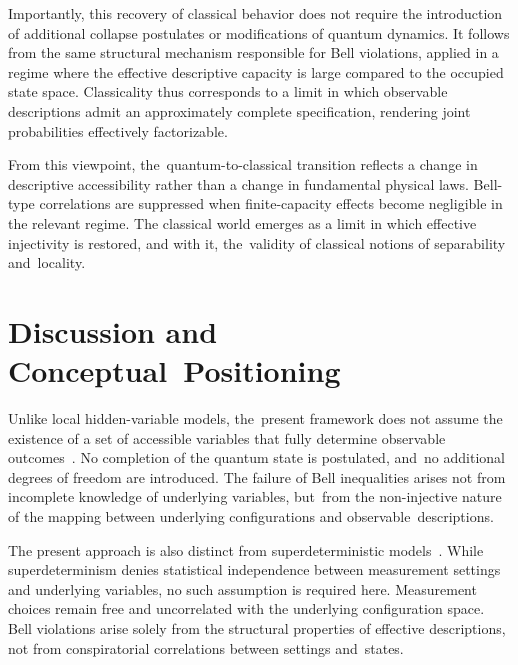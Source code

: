 \documentclass[11pt,a4paper]{article}
\theoremstyle{remark}
\begin{document}
  Importantly, this recovery of classical behavior does not require the introduction
  of additional collapse postulates or modifications of quantum dynamics.
  It follows from the same structural mechanism responsible for Bell violations,
  applied in a regime where the effective descriptive capacity is large compared to
  the occupied state space.
  Classicality thus corresponds to a limit in which observable descriptions admit an
  approximately complete specification, rendering joint probabilities effectively
  factorizable.

  From this viewpoint, the~quantum-to-classical transition reflects a change in
  descriptive accessibility rather than a change in fundamental physical laws.
  Bell-type correlations are suppressed when finite-capacity effects become negligible
  in the relevant regime.
  The classical world emerges as a limit in which effective injectivity is restored,
  and with it, the~validity of classical notions of separability and~locality.

  \section{Discussion and Conceptual~Positioning}
  \label{sec:discussion}


  Unlike local hidden-variable models, the~present framework does not assume the
  existence of a set of accessible variables that fully determine observable outcomes~\cite{tHooft2016CAI}.
  No completion of the quantum state is postulated, and~no additional degrees of
  freedom are introduced.
  The failure of Bell inequalities arises not from incomplete knowledge of underlying
  variables, but~from the non-injective nature of the mapping between underlying
  configurations and observable~descriptions.

  The present approach is also distinct from superdeterministic models~\cite{Hall2010LocalDeterministic}.
  While superdeterminism denies statistical independence between measurement settings
  and underlying variables, no such assumption is required here.
  Measurement choices remain free and uncorrelated with the underlying configuration space.
  Bell violations arise solely from the structural properties of effective descriptions,
  not from conspiratorial correlations between settings and~states.
\end{document}
